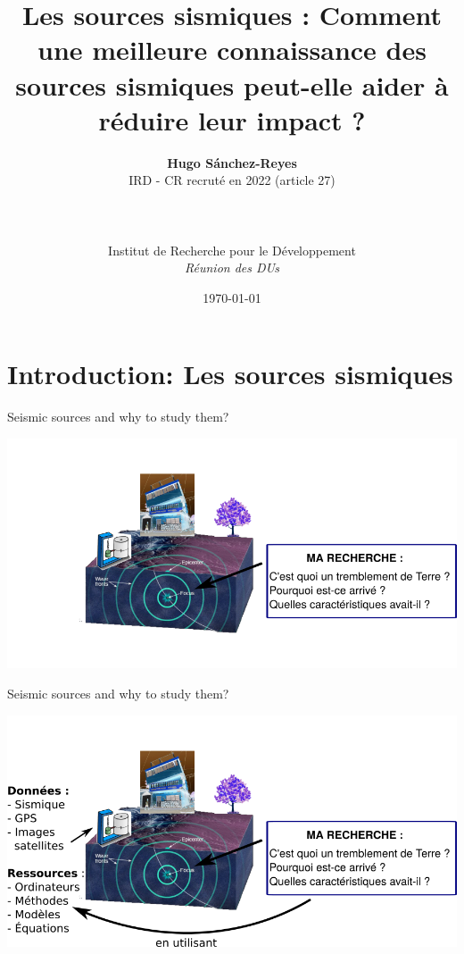 \documentclass{beamer}
\title{{\normalsize \vskip 1.5cm {\bf Les sources sismiques :} Comment une meilleure connaissance des sources sismiques peut-elle aider à réduire leur impact ?}}
\author{ {\bf Hugo Sánchez-Reyes} \\ IRD - CR recruté en 2022 (article 27) \\
\\ 
\\
\\
\vfill
{Institut de Recherche pour le Développement} \\
\textit{Réunion des DUs}
}
\date[2022]{\today}
\begin{document}

\begin{frame}
    \titlepage
\end{frame}

\section{Introduction: Les sources sismiques}

\begin{frame}{Seismic sources and why to study them?}

    \begin{center}
        \vskip -0.3cm \includegraphics[width=1\linewidth]{images/earthquake_whys_whats_1-1} \\     
    \end{center}
    
\end{frame}


\begin{frame}{Seismic sources and why to study them?}

    \begin{center}
        \vskip -0.3cm \includegraphics[width=1\linewidth]{images/earthquake_whys_whats_2-1} \\     
    \end{center}
    \addtocounter{framenumber}{-1}
    
\end{frame}
\end{document}
